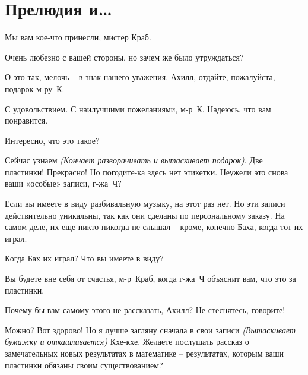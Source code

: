 \documentclass[../main.tex]{subfiles}
\begin{document}
\section{Прелюдия и\ldots{}}



\begin{dialogue}

 Мы вам кое-что принесли, мистер Краб.

 Очень любезно с вашей стороны, но зачем же было утруждаться?

 О это так, мелочь \--- в знак нашего уважения. Ахилл, отдайте, пожалуйста, подарок м-ру~К.

 С удовольствием. С наилучшими пожеланиями, м-р~К\@. Надеюсь, что вам понравится.


 Интересно, что это такое?

 Сейчас узнаем \emph{(Кончает разворачивать и вытаскивает подарок)}. Две пластинки! Прекрасно! Но погодите-ка здесь нет этикетки. Неужели это снова ваши «особые» записи, г-жа~Ч?

 Если вы имеете в виду разбивальную музыку, на этот раз нет. Но эти записи действительно уникальны, так как они сделаны по персональному заказу. На самом деле, их еще никто никогда не слышал \--- кроме, конечно Баха, когда тот их играл.

 Когда Бах их играл? Что вы имеете в виду?

 Вы будете вне себя от счастья, м-р~Краб, когда г-жа~Ч объяснит вам, что это за пластинки.

 Почему бы вам самому этого не рассказать, Ахилл? Не стеснятесь, говорите!

 Можно? Вот здорово! Но я лучше загляну сначала в свои записи \emph{(Вытаскивает бумажку и откашливается)} Кхе-кхе. Желаете послушать рассказ о замечательных новых результатах в математике \--- результатах, которым ваши пластинки обязаны своим существованием?


\end{dialogue}
\end{document}
